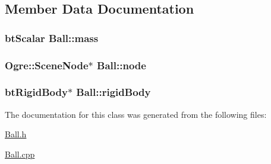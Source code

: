 \subsection{Member Data Documentation}
\hypertarget{classBall_aee2035d202321b658c0869f1e885766b}{
\subsubsection[{mass}]{\setlength{\rightskip}{0pt plus 5cm}bt\-Scalar Ball\-::mass\hspace{0.3cm}{\ttfamily [private]}}}\label{classBall_aee2035d202321b658c0869f1e885766b}
\hypertarget{classBall_af1e78462805ffd11789b6e6d3940068f}{
\subsubsection[{node}]{\setlength{\rightskip}{0pt plus 5cm}Ogre\-::\-Scene\-Node$\ast$ Ball\-::node\hspace{0.3cm}{\ttfamily [private]}}}\label{classBall_af1e78462805ffd11789b6e6d3940068f}
\hypertarget{classBall_aa692f8be903d336bb9908482c464ff4b}{
\subsubsection[{rigid\-Body}]{\setlength{\rightskip}{0pt plus 5cm}bt\-Rigid\-Body$\ast$ Ball\-::rigid\-Body\hspace{0.3cm}{\ttfamily [private]}}}\label{classBall_aa692f8be903d336bb9908482c464ff4b}


The documentation for this class was generated from the following files\-:\begin{DoxyCompactItemize}
\item 
\hyperlink{Ball_8h}{Ball.\-h}\item 
\hyperlink{Ball_8cpp}{Ball.\-cpp}\end{DoxyCompactItemize}
